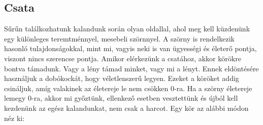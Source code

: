 \documentclass[12pt,a4paper,oneside]{report}
\begin{document}
      \subsection{Csata}
        Sűrűn találkozhatunk kalandunk során olyan oldallal, ahol meg kell
        küzdenünk egy különleges teremtménnyel, mesebeli szörnnyel. A szörny is
        rendelkezik hasonló tulajdonságokkal, mint mi, vagyis neki is van
        ügyességi és életerő pontja, viszont nincs szerencse pontja.
        Amikor elérkezünk a csatához, akkor körökre bontva támadunk. Vagy a
        lény támad minket, vagy mi a lényt. Ennek eldöntésére használjuk a
        dobókockát, hogy véletlenszerű legyen. Ezeket a köröket addig
        csináljuk, amíg valakinek az életereje le nem csökken 0-ra. Ha a
        szörny életereje lemegy 0-ra, akkor mi győztünk, ellenkező esetben
        vesztettünk és újból kell kezdenünk az egész kalandunkat, nem csak a
        harcot. Egy kör az alábbi módon néz ki:
\end{document}
